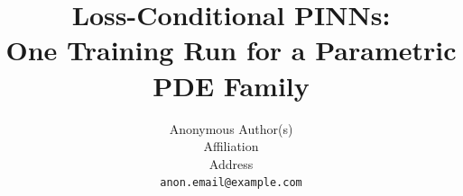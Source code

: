 \documentclass{article}
\title{Loss-Conditional PINNs:\\
       One Training Run for a Parametric PDE Family}
\author{%
  Anonymous Author(s)\\
  Affiliation\\
  Address\\
  \texttt{anon.email@example.com}%
}
\begin{document}
\maketitle

\begin{abstract}

\end{abstract}











\appendix


\newpage

\end{document}
